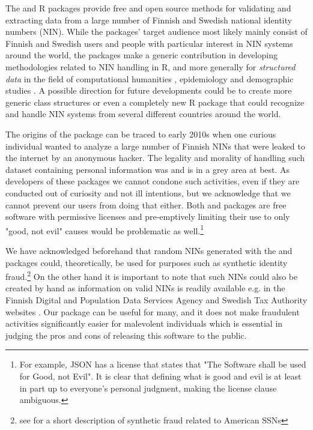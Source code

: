 The  and  R packages provide free and open source methods for validating and extracting data from a large number of Finnish and Swedish national identity numbers (NIN). While the packages' target audience most likely mainly consist of Finnish and Swedish users and people with particular interest in NIN systems around the world, the packages make a generic contribution in developing methodologies related to NIN handling in R, and more generally for {\it structured data} in the field of computational humanities \citep[see][]{makela2020}, epidemiology and demographic studies \citep[see][]{gissler2004}. A possible direction for future developments could be to create more generic class structures or even a completely new R package that could recognize and handle NIN systems from several different countries around the world.

The origins of the  package can be traced to early 2010s when one curious individual wanted to analyze a large number of Finnish NINs that were leaked to the internet by an anonymous hacker. The legality and morality of handling such dataset containing personal information was and is in a grey area at best. As developers of these packages we cannot condone such activities, even if they are conducted out of curiosity and not ill intentions, but we acknowledge that we cannot prevent our users from doing that either. Both  and  packages are free software with permissive licenses and pre-emptively limiting their use to only "good, not evil" causes would be problematic as well.\footnote{For example, JSON has a license that states that "The Software shall be used for Good, not Evil". It is clear that defining what is good and evil is at least in part up to everyone's personal judgment, making the license clause ambiguous.}

We have acknowledged beforehand that random NINs generated with the  and  packages could, theoretically, be used for purposes such as synthetic identity fraud.\footnote{see \citet[32]{brensinger2021} for a short description of synthetic fraud related to American SSNs} On the other hand it is important to note that such NINs could also be created by hand as information on valid NINs is readily available e.g. in the Finnish Digital and Population Data Services Agency and Swedish Tax Authority websites \citep{hetudvv, sv2007}. Our package can be useful for many, and it does not make fraudulent activities significantly easier for malevolent individuals which is essential in judging the pros and cons of releasing this software to the public.

